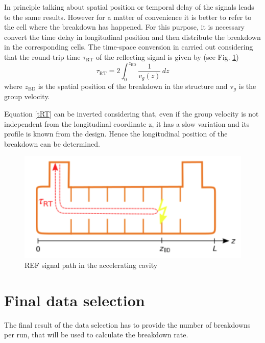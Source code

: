 In principle talking about spatial position or temporal delay of the signals leads to the same results. However for a matter of convenience it is better to refer to the cell where the breakdown has happened. For this purpose, it is necessary convert the time delay in longitudinal position and then distribute the breakdown in the corresponding cells. The time-space conversion in carried out considering that the round-trip time $\tau_{\text{RT}}$  of the reflecting signal is given by (see Fig. \ref{tToz_p})
\begin{equation}
\tau_{\text{RT}} = 2 \int_0^{z_{\text{BD}}} \frac{1}{v_g (z)} \, dz
\label{tRT}
\end{equation}
where $z_{\text{BD}}$ is the spatial position of the breakdown in the structure and v$_g$ is the group velocity.

Equation \ref{tRT} can be inverted considering that, even if the group velocity is not independent from the longitudinal coordinate z, it has a slow variation and its profile is known from the design. Hence the longitudinal position of the breakdown can be determined. 


\begin{figure}[h]
\centering 
\includegraphics[scale=0.3]{pictures/tToz}
\caption{REF signal path in the accelerating cavity}
\label{tToz_p}
\end{figure}




\section[Final data selection]{Final data selection}

The final result of the data selection has to provide the number of breakdowns per run, that will be used to calculate the breakdown rate. 

